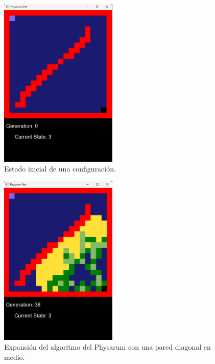     \vskip 0.5cm
    \begin{figure}[htbp]
        \centering
        \includegraphics[width=0.5\textwidth]{./images/Pruebas/simulador/image065.png}
        \caption{Estado inicial de una configuraci\'on.}
        \label{fig:Ruta 65}
    \end{figure}
    \vskip 0.5cm
    \begin{figure}[htbp]
        \centering
        \includegraphics[width=0.5\textwidth]{./images/Pruebas/simulador/image067.png}
        \caption{Expansi\'on del algoritmo del Physarum con una pared diagonal en medio.}
        \label{fig:Ruta 67}
    \end{figure}
    \vskip 0.5cm
